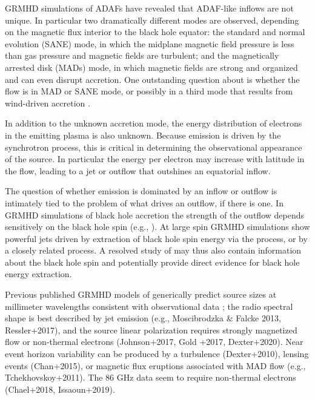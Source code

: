 GRMHD simulations of ADAFs have revealed that ADAF-like inflows are not unique. In particular two dramatically different modes are observed, depending on the magnetic flux interior to the black hole equator: the standard and normal evolution (SANE) mode, in which the midplane magnetic field pressure is less than gas pressure and magnetic fields are turbulent; and the magnetically arrested disk (MADs) mode, in which magnetic fields are strong and organized and can even disrupt accretion.  One outstanding question about \sgra is whether the flow is in MAD or SANE mode, or possibly in a third mode that results from wind-driven accretion \citep{2020ApJ...896L...6R}.

In addition to the unknown accretion mode, the energy distribution of electrons in the emitting plasma is also unknown.  Because emission is driven by the synchrotron process, this is critical in determining the observational appearance of the source.  In particular the energy per electron may increase with latitude in the flow, leading to a jet or outflow that outshines an equatorial inflow.

The question of whether emission is dominated by an inflow or outflow is intimately tied to the problem of what drives an outflow, if there is one.  In GRMHD simulations of black hole accretion the strength of the outflow depends sensitively on the black hole spin (e.g., ).  At large spin GRMHD simulations show powerful jets driven by extraction of black hole spin energy via the \citet{1977MNRAS.179..433B} process, or by a closely related process.  A resolved study of \sgra may thus also contain information about the black hole spin and potentially provide direct evidence for black hole energy extraction.


Previous published GRMHD models of \sgra generically predict source sizes at millimeter wavelengths consistent with observational data \citealt[e.g.,][]{2008Natur.455...78D, 2009ApJ...706..497M, 2009ApJ...703L.142D};
the radio spectral shape is best described by jet emission (e.g., Moscibrodzka \& Falcke 2013, Ressler+2017), and the source linear polarization requires strongly magnetized flow or non-thermal electrons (Johnson+2017, Gold +2017, Dexter+2020). Near event horizon variability can be produced by a turbulence (Dexter+2010), lensing events (Chan+2015), or magnetic flux eruptions associated with MAD flow (e.g., Tchekhovskoy+2011). The 86 GHz data seem to require non-thermal electrons (Chael+2018, Issaoun+2019).

